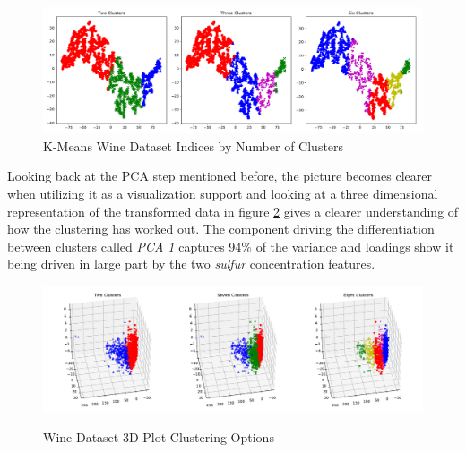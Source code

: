 \begin{figure}[H]
\caption{K-Means Wine Dataset Indices by Number of Clusters}
\begin{center}
\includegraphics[width=1.0\textwidth]{images/kmeans_wine_tsne.pdf}
\end{center}
\label{fig:kmeans_wine_tsne}
\end{figure}

Looking back at the PCA step mentioned before, the picture becomes clearer when utilizing it as a visualization support and looking at a three dimensional representation of the transformed data in figure \ref{fig:kmeans_wine_3d_multi} gives a clearer understanding of how the clustering has worked out. The component driving the differentiation between clusters called \textit{PCA 1} captures 94\% of the variance and loadings show it being driven in large part by the two \textit{sulfur} concentration features.

\vspace{-0.5cm}
\begin{figure}[H]
\caption{Wine Dataset 3D Plot Clustering Options}
\centering
\includegraphics[width=1.0\textwidth]{images/kmeans_wine_3d_multi.pdf}
\label{fig:kmeans_wine_3d_multi}
\end{figure}


